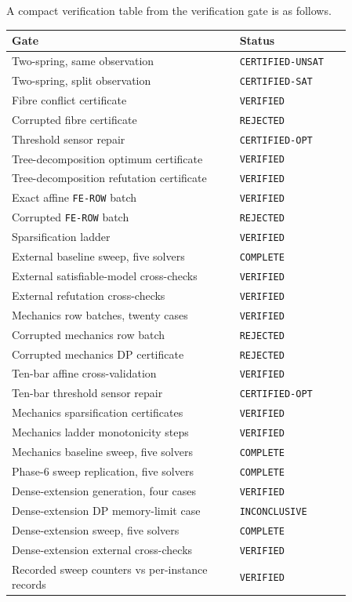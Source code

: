 \documentclass[11pt]{article}
\theoremstyle{plain}
\theoremstyle{definition}
\theoremstyle{remark}
\begin{document}
A compact verification table from the verification gate is as follows.
\begin{center}
\begin{tabular}{@{}p{0.58\linewidth}p{0.28\linewidth}@{}}
\toprule
Gate & Status\\
\midrule
Two-spring, same observation & \texttt{CERTIFIED-UNSAT}\\
Two-spring, split observation & \texttt{CERTIFIED-SAT}\\
Fibre conflict certificate & \texttt{VERIFIED}\\
Corrupted fibre certificate & \texttt{REJECTED}\\
Threshold sensor repair & \texttt{CERTIFIED-OPT}\\
Tree-decomposition optimum certificate & \texttt{VERIFIED}\\
Tree-decomposition refutation certificate & \texttt{VERIFIED}\\
Exact affine \texttt{FE-ROW} batch & \texttt{VERIFIED}\\
Corrupted \texttt{FE-ROW} batch & \texttt{REJECTED}\\
Sparsification ladder & \texttt{VERIFIED}\\
External baseline sweep, five solvers & \texttt{COMPLETE}\\
External satisfiable-model cross-checks & \texttt{VERIFIED}\\
External refutation cross-checks & \texttt{VERIFIED}\\
Mechanics row batches, twenty cases & \texttt{VERIFIED}\\
Corrupted mechanics row batch & \texttt{REJECTED}\\
Corrupted mechanics DP certificate & \texttt{REJECTED}\\
Ten-bar affine cross-validation & \texttt{VERIFIED}\\
Ten-bar threshold sensor repair & \texttt{CERTIFIED-OPT}\\
Mechanics sparsification certificates & \texttt{VERIFIED}\\
Mechanics ladder monotonicity steps & \texttt{VERIFIED}\\
Mechanics baseline sweep, five solvers & \texttt{COMPLETE}\\
Phase-6 sweep replication, five solvers & \texttt{COMPLETE}\\
Dense-extension generation, four cases & \texttt{VERIFIED}\\
Dense-extension DP memory-limit case & \texttt{INCONCLUSIVE}\\
Dense-extension sweep, five solvers & \texttt{COMPLETE}\\
Dense-extension external cross-checks & \texttt{VERIFIED}\\
Recorded sweep counters vs per-instance records & \texttt{VERIFIED}\\
\bottomrule
\end{tabular}
\end{center}
\end{document}
